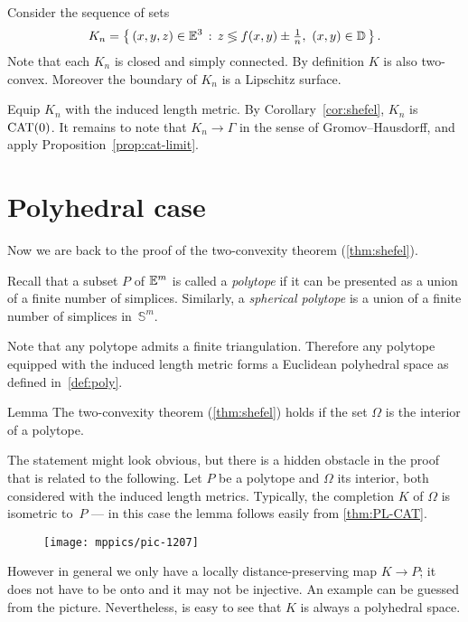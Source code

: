 Consider the sequence of sets 
\[K_n
=
\left\{\,{(x,y,z)\in \mathbb{E}^3}\,:\,{z\lessgtr f(x,y)\pm\tfrac1n,\ (x,y)\in \mathbb{D}}\,\right\}.\]
Note that each $K_n$ is closed and simply connected.
By definition $K$ is also two-convex. 
Moreover the boundary of $K_n$ is a Lipschitz surface.

Equip $K_n$ with the induced length metric.
By Corollary~\ref{cor:shefel},
$K_n$ is $\mathrm{CAT}(0)$.
It remains to note that $K_n\to \Gamma$ in the sense of Gromov--Hausdorff, and apply Proposition~\ref{prop:cat-limit}.
\qeds

\section{Polyhedral case}

Now we are back to the proof of the two-convexity theorem (\ref{thm:shefel}).

Recall that a subset $P$ of $\mathbb{E}^m$ is called a \emph{polytope} 
if it can be presented as a union of a  finite number of simplices.
Similarly,
a \emph{spherical polytope}
is a union of a  finite number of simplices in~$\mathbb{S}^m$.

Note that any polytope admits a finite triangulation.
Therefore any polytope equipped with the induced length metric 
forms a Euclidean polyhedral space as defined in~\ref{def:poly}.
 
\begin{thm}{Lemma}\label{lem:poly-shefel}
The two-convexity theorem (\ref{thm:shefel}) holds if the set $\Omega$ is the interior of a polytope.
\end{thm}

The statement might look obvious, but there is a hidden obstacle in the proof that is related to the following.
Let $P$ be a polytope and $\Omega$ its interior,
both considered with the induced length metrics.
Typically, the completion $K$ of $\Omega$ 
is isometric to~$P$ --- in this case the lemma follows easily from
\ref{thm:PL-CAT}.

\begin{wrapfigure}{r}{20mm}
\vskip-0mm
\centering
\texttt{[image: mppics/pic-1207]}
\end{wrapfigure}

However in general
we only have a locally distance-preserving map $K\to P$;
it does not have to be onto and it may not be injective. 
An example can be guessed from the picture.
Nevertheless, is easy to see that $K$ is always a polyhedral space.


